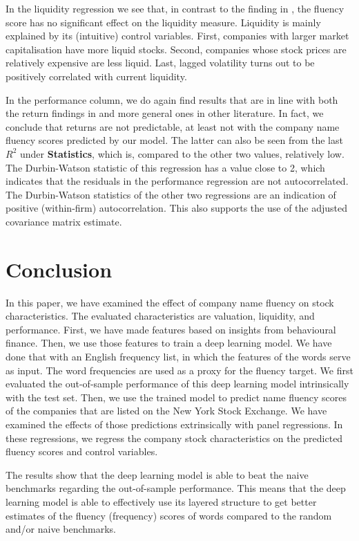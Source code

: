 \documentclass[11pt]{article}
\begin{document}
In the liquidity regression we see that, in contrast to the finding in \cite{green2013company}, the fluency score has no significant effect on the liquidity measure. Liquidity is mainly explained by its (intuitive) control variables. First, companies with larger market capitalisation have more liquid stocks. Second, companies whose stock prices are relatively expensive are less liquid. Last, lagged volatility turns out to be positively correlated with current liquidity. 

In the performance column, we do again find results that are in line with both the return findings in \cite{green2013company} and more general ones in other literature. In fact, we conclude that returns are not predictable, at least not with the company name fluency scores predicted by our model. The latter can also be seen from the last $R^2$ under \textbf{Statistics}, which is, compared to the other two values, relatively low. The Durbin-Watson statistic of this regression has a value close to 2, which indicates that the residuals in the performance regression are not autocorrelated. The Durbin-Watson statistics of the other two regressions are an indication of positive (within-firm) autocorrelation. This also supports the use of the adjusted covariance matrix estimate. 






\newpage
\section{Conclusion}
In this paper, we have examined the effect of company name fluency on stock characteristics. The evaluated characteristics are valuation, liquidity, and performance.
First, we have made features based on insights from behavioural finance. Then, we use those features to train a deep learning model. We have done that with an English frequency list, in which the features of the words serve as input. The word frequencies are used as a proxy for the fluency target. We first evaluated the out-of-sample performance of this deep learning model intrinsically with the test set. Then, we use the trained model to predict name fluency scores of the companies that are listed on the New York Stock Exchange. We have examined the effects of those predictions extrinsically with panel regressions. In these regressions, we regress the company stock characteristics on the predicted fluency scores and control variables.

The results show that the deep learning model is able to beat the naive benchmarks regarding the out-of-sample performance. This means that the deep learning model is able to effectively use its layered structure to get better estimates of the fluency (frequency) scores of words compared to the random and/or naive benchmarks. 
\end{document}
